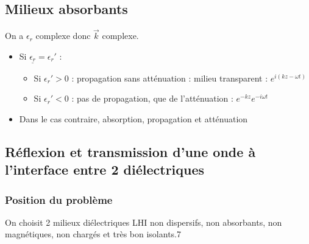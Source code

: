 \documentclass[french]{yLectureNote}
\renewcommand{\vec}{\overrightarrow}
\begin{document}
\subsection{Milieux absorbants}
On a $\epsilon_r$ complexe donc $\vec{k}$ complexe.












\begin{itemize}
    \item Si $\underline{\epsilon_r} = \epsilon_r'$ : 
\begin{itemize}
    \item Si $\epsilon_r' >0$ : propagation sans atténuation : milieu transparent : $e^{i(kz-\omega t)}$
    \item Si $\epsilon_r'<0$ : pas de propagation, que de l'atténuation : $e^{-kz}e^{-i\omega t}$ 
\end{itemize}
\item Dans le cas contraire,  absorption, propagation et atténuation
\end{itemize}

\subsection{Réflexion et transmission d'une onde à l'interface entre 2 diélectriques}
\subsubsection{Position du problème}
On choisit 2 milieux diélectriques LHI non dispersifs, non absorbants, non magnétiques, non chargés et très bon isolants.7
\end{document}
